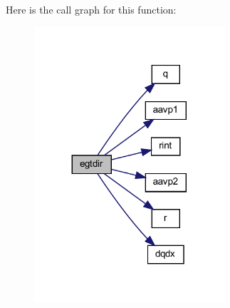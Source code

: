 Here is the call graph for this function\+:\nopagebreak
\begin{figure}[H]
\begin{center}
\leavevmode
\includegraphics[width=200pt]{Leroi__c_8f90_a24151574c4bb3d7844db88f91d23b589_cgraph}
\end{center}
\end{figure}
\mbox{\label{Leroi__c_8f90_a7312ba6fbf8b492624e2663b1255893f}} 

